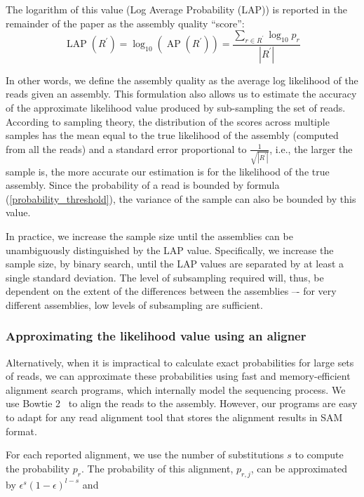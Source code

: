 \documentclass[12pt,\mydriver]{thesis}
\begin{document}
The logarithm of this value (Log Average Probability (LAP)) is
reported in the remainder of the paper as the assembly quality ``score'':
\begin{equation}
  \label{average_log_probability}
  \operatorname{LAP}(R^\prime) = \log_{10} \left( \operatorname{AP}(R^\prime) \right) = \frac{\sum_{r \in R^\prime} \log_{10} p_r}{\left|R^\prime\right|}
\end{equation}

In other words, we define the assembly quality as the average log
likelihood of the reads given an assembly.  This formulation
also allows us to estimate the accuracy of the approximate likelihood
value produced by sub-sampling the set of reads.  According to
sampling theory, the distribution of the scores across multiple
samples has the mean equal to the true likelihood of the assembly
(computed from all the reads) and a standard error proportional to
$\frac{1}{\sqrt{\left|R^\prime\right|}}$, i.e., the larger the sample is,
the more accurate our estimation is for the likelihood of the true assembly.
Since the probability of a read is bounded by formula (\ref{probability_threshold}), the variance of the sample can also be bounded by this value.

In practice, we increase the sample size until the assemblies can be unambiguously distinguished by the LAP value.
Specifically, we increase the sample size, by binary search, until the LAP values are separated by at least a single standard deviation.  The level of subsampling required will, thus, be dependent on the extent of the differences between the assemblies –- for very different assemblies, low levels of subsampling are sufficient.

\subsubsection{Approximating the likelihood value using an aligner}
\label{methods_aligner}
Alternatively, when it is impractical to calculate exact probabilities
for large sets of reads, we can approximate these probabilities using
fast and memory-efficient alignment search programs, which internally
model the sequencing process.  We use Bowtie 2~\cite{langmead2012fast} to align the reads to
the assembly.  However, our programs are easy to adapt for any
read alignment tool that stores the alignment results in
SAM\cite{li2009sequence} format.

For each reported alignment, we use the number of substitutions $s$ to
compute the probability $p_{r}$.  The probability of this alignment, $p_{r,j}$,
can be approximated by $\epsilon^{s}(1 - \epsilon)^{l - s}$ and
\end{document}
